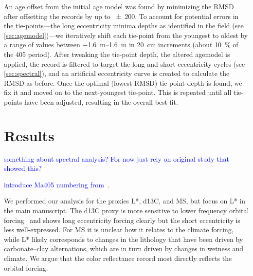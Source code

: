 \documentclass[draft]{agujournal2019}
\newcommand{\ijk}{\textcolor{blue}}
\begin{document}

An age offset from the initial age model was found by minimizing the \gls{RMSD} after offsetting the records by up to \qty{\pm200}{\kiloyear}.
To account for potential errors in the tie-points---the long eccentricity minima depths as identified in the field (see \cref{sec:agemodel})---we iteratively shift each tie-point from the youngest to oldest by a range of values between \qtyrange[range-phrase=~to~]{-1.6}{1.6}{\metre} in \qty{20}{\centi\metre} increments (about \qty{10}{\percent} of the \qty{405}{\kiloyear} period).
After tweaking the tie-point depth, the altered agemodel is applied, the record is filtered to target the long and short eccentricity cycles (see \cref{sec:spectral}), and an artificial eccentricity curve is created to calculate the \gls{RMSD} as before.
Once the optimal (lowest \gls{RMSD}) tie-point depth is found, we fix it and moved on to the next-youngest tie-point.
This is repeated until all tie-points have been adjusted, resulting in the overall best fit.

\section{Results}\label{sec:results}

\ijk{something about spectral analysis? For now just rely on original study that showed this?}

\ijk{introduce Ma405 numbering from~\cite{Husson2014}}.

We performed our analysis for the proxies \gls{L*}, \gls{d13C}, and \gls{MS}, but  focus on \gls{L*} in the main manuscript.
The \gls{d13C} proxy is more sensitive to lower frequency orbital forcing~\cite{Zeebe2017,Kocken2019loscar} and shows long eccentricity forcing clearly but the short eccentricity is less well-expressed.
For \gls{MS} it is unclear how it relates to the climate forcing, %
while \gls{L*} likely corresponds to changes in the lithology that have been driven by carbonate--clay alternations, which are in turn driven by changes in wetness and climate.
We argue that the color reflectance record most directly reflects the orbital forcing.
\end{document}
